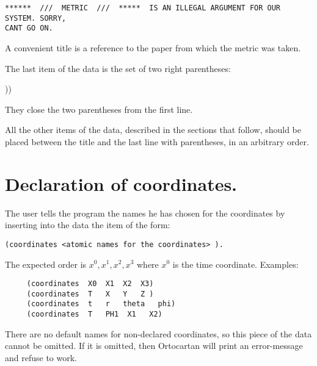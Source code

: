 \bigskip

\begin{verbatim}
******  ///  METRIC  ///  *****  IS AN ILLEGAL ARGUMENT FOR OUR SYSTEM. SORRY,
CANT GO ON.
\end{verbatim}

\bigskip

\noindent A convenient title is a reference to the  paper  from  which
     the metric was taken.

The last item of the data  is  the  set  of  two  right
     parentheses:

\bigskip

                        ))

\bigskip

\noindent They close the two parentheses from the first line.

All the other items of the data, described in the  sections  that  follow,
should be placed between the title and
     the last line with parentheses, in an arbitrary order.

\section{Declaration of coordinates.}

The user tells the program the names he has chosen  for
     the  coordinates  by inserting into the data the item of the
     form:

\bigskip

\begin{verbatim}
(coordinates <atomic names for the coordinates> ).
\end{verbatim}

\bigskip

\noindent The expected order is $x^0, x^1, x^2, x^3$ where $x^0$  is  the  time
     coordinate. Examples:

\bigskip

\begin{verbatim}
     (coordinates  X0  X1  X2  X3)
     (coordinates  T   X   Y   Z )
     (coordinates  t   r   theta   phi)
     (coordinates  T   PH1  X1   X2)
\end{verbatim}

\bigskip

\noindent There are no default names for non-declared coordinates,  so
     this  piece of the data cannot be omitted. If it is omitted,
     then Ortocartan will print an error-message  and  refuse  to
     work.

